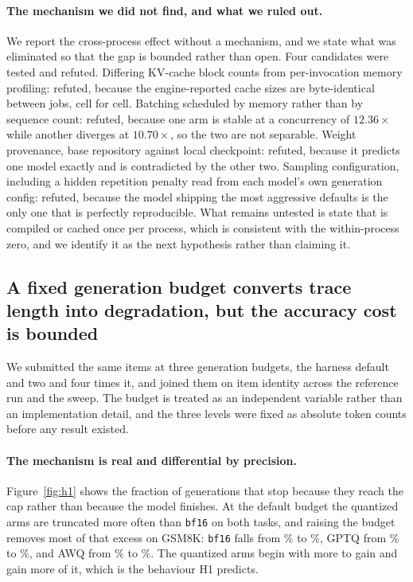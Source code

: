 \documentclass[11pt]{article}
\begin{document}
\paragraph{The mechanism we did not find, and what we ruled out.}
We report the cross-process effect without a mechanism, and we state what was
eliminated so that the gap is bounded rather than open. Four candidates were
tested and refuted. Differing KV-cache block counts from per-invocation memory
profiling: refuted, because the engine-reported cache sizes are byte-identical
between jobs, cell for cell. Batching scheduled by memory rather than by
sequence count: refuted, because one arm is stable at a concurrency of
$12.36\times$ while another diverges at $10.70\times$, so the two are not
separable. Weight provenance, base repository against local checkpoint: refuted,
because it predicts one model exactly and is contradicted by the other two.
Sampling configuration, including a hidden repetition penalty read from each
model's own generation config: refuted, because the model shipping the most
aggressive defaults is the only one that is perfectly reproducible. What remains
untested is state that is compiled or cached once per process, which is
consistent with the within-process zero, and we identify it as the next
hypothesis rather than claiming it.

\subsection{A fixed generation budget converts trace length into degradation, but the
accuracy cost is bounded}
\label{sec:h1}


We submitted the same \hOneItems{} items at three generation budgets, the harness default
and two and four times it, and joined them on item identity across the reference run and
the sweep. The budget is treated as an independent variable rather than an implementation
detail, and the three levels were fixed as absolute token counts before any result existed.

\paragraph{The mechanism is real and differential by precision.}
Figure~\ref{fig:h1} shows the fraction of generations that stop because they reach the cap
rather than because the model finishes. At the default budget the quantized arms are
truncated more often than \texttt{bf16} on both tasks, and raising the budget removes most
of that excess on GSM8K: \texttt{bf16} falls from \hOneCapBfOne\% to \hOneCapBfFour\%, GPTQ
from \hOneCapGptqOne\% to \hOneCapGptqFour\%, and AWQ from \hOneCapAwqOne\% to
\hOneCapAwqFour\%. The quantized arms begin with more to gain and gain more of it, which is
the behaviour H1 predicts.
\end{document}
